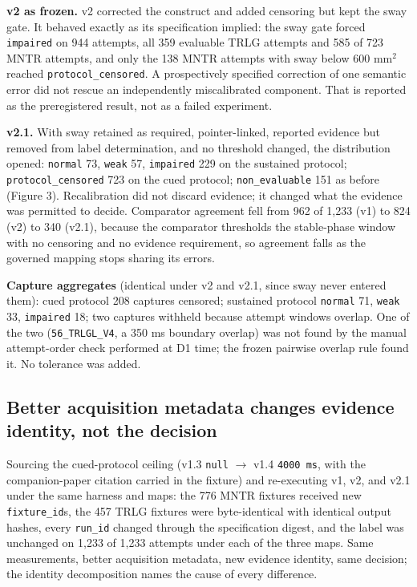 \documentclass[11pt]{article}
\begin{document}
\textbf{v2 as frozen.} v2 corrected the construct and added censoring but kept the sway gate. It behaved exactly as its specification implied: the sway gate forced \texttt{impaired} on 944 attempts, all 359 evaluable TRLG attempts and 585 of 723 MNTR attempts, and only the 138 MNTR attempts with sway below 600 mm$^{2}$ reached \texttt{protocol\_censored}. A prospectively specified correction of one semantic error did not rescue an independently miscalibrated component. That is reported as the preregistered result, not as a failed experiment.

\textbf{v2.1.} With sway retained as required, pointer-linked, reported evidence but removed from label determination, and no threshold changed, the distribution opened: \texttt{normal} 73, \texttt{weak} 57, \texttt{impaired} 229 on the sustained protocol; \texttt{protocol\_censored} 723 on the cued protocol; \texttt{non\_evaluable} 151 as before (Figure 3). Recalibration did not discard evidence; it changed what the evidence was permitted to decide. Comparator agreement fell from 962 of 1,233 (v1) to 824 (v2) to 340 (v2.1), because the comparator thresholds the stable-phase window with no censoring and no evidence requirement, so agreement falls as the governed mapping stops sharing its errors.

\textbf{Capture aggregates} (identical under v2 and v2.1, since sway never entered them): cued protocol 208 captures censored; sustained protocol \texttt{normal} 71, \texttt{weak} 33, \texttt{impaired} 18; two captures withheld because attempt windows overlap. One of the two (\texttt{56\_TRLGL\_V4}, a 350 ms boundary overlap) was not found by the manual attempt-order check performed at D1 time; the frozen pairwise overlap rule found it. No tolerance was added.

\subsection{Better acquisition metadata changes evidence identity, not the decision}\label{better-acquisition-metadata-changes-evidence-identity-not-the-decision}

Sourcing the cued-protocol ceiling (v1.3 \texttt{null} $\rightarrow$ v1.4 \texttt{4000\ ms}, with the companion-paper citation carried in the fixture) and re-executing v1, v2, and v2.1 under the same harness and maps: the 776 MNTR fixtures received new \texttt{fixture\_id}s, the 457 TRLG fixtures were byte-identical with identical output hashes, every \texttt{run\_id} changed through the specification digest, and the label was unchanged on 1,233 of 1,233 attempts under each of the three maps. Same measurements, better acquisition metadata, new evidence identity, same decision; the identity decomposition names the cause of every difference.
\end{document}

